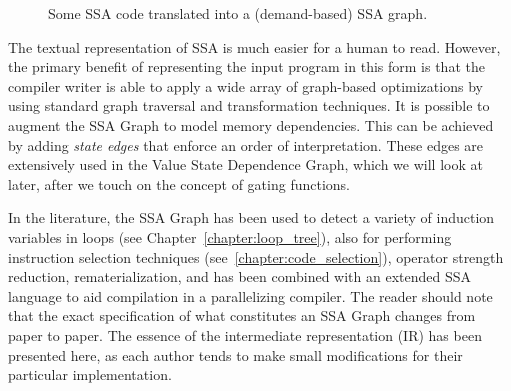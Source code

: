 \begin{figure}[ht]
\centering
{}

\caption{Some SSA code translated into a (demand-based) SSA graph.}
\label{fig: ssa-graph-example-code}
\end{figure}

The textual representation of SSA is much easier for a human to read. 
However, the primary benefit of representing the input program in this form is that the compiler writer is able to apply a wide array of graph-based optimizations by using standard graph traversal and transformation techniques. 
It is possible to augment the SSA Graph to model memory dependencies. 
This can be achieved by adding \textit{state edges} that enforce an order of interpretation. 
These edges are extensively used in the Value State Dependence Graph, which we will look at later, after we touch on the concept of gating functions.

In the literature, the SSA Graph has been used to detect a variety of induction variables in loops (see Chapter~\ref{chapter:loop_tree}), also for performing instruction selection techniques (see~\ref{chapter:code_selection}), operator strength reduction, rematerialization, and has been combined with an extended SSA language to aid compilation in a parallelizing compiler. 
The reader should note that the exact specification of what constitutes an SSA Graph changes from paper to paper. 
The essence of the intermediate representation (IR) has been presented here, as each author tends to make small modifications for their particular implementation.

